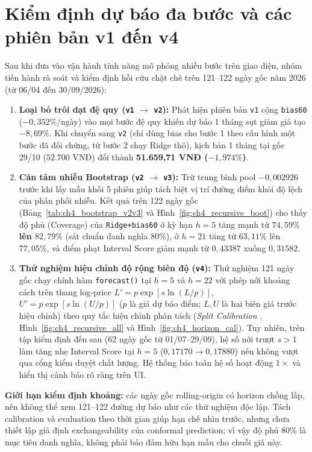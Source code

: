 \documentclass[12pt,a4paper]{report}
\begin{document}
\section{Kiểm định dự báo đa bước và các phiên bản v1 đến v4}
Sau khi đưa vào vận hành tính năng mô phỏng nhiều bước trên giao diện, nhóm tiến hành rà soát và kiểm định hồi cứu chặt chẽ trên 121--122 ngày gốc năm 2026 (từ 06/04 đến 30/09/2026):
\begin{enumerate}
    \item \textbf{Loại bỏ trôi dạt đệ quy (\texttt{v1} $\to$ \texttt{v2}):} Phát hiện phiên bản \texttt{v1} cộng \texttt{bias60} ($-0,352\%$/ngày) vào mọi bước đệ quy khiến dự báo 1 tháng sụt giảm giả tạo $-8,69\%$. Khi chuyển sang \texttt{v2} (chỉ dùng bias cho bước 1 theo cấu hình một bước đã đối chứng, từ bước 2 chạy Ridge thô), kịch bản 1 tháng tại gốc 29/10 ($52.700$ VNĐ) đổi thành \textbf{51.659,71 VNĐ ($-1,974\%$)}.
    \item \textbf{Căn tâm nhiễu Bootstrap (\texttt{v2} $\to$ \texttt{v3}):} Trừ trung bình pool $-0,002926$ trước khi lấy mẫu khối 5 phiên giúp tách biệt vị trí đường điểm khỏi độ lệch của phân phối nhiễu. Kết quả trên 122 ngày gốc (Bảng~\ref{tab:ch4_bootstrap_v2v3} và Hình~\ref{fig:ch4_recursive_boot}) cho thấy độ phủ (Coverage) của \texttt{Ridge+bias60} ở kỳ hạn $h=5$ tăng mạnh từ \textbf{$74,59\%$ lên $82,79\%$} (sát chuẩn danh nghĩa $80\%$), ở $h=21$ tăng từ $63,11\%$ lên $77,05\%$, và điểm phạt Interval Score giảm mạnh từ $0,43387$ xuống $0,31582$.
    \item \textbf{Thử nghiệm hiệu chỉnh độ rộng biên độ (\texttt{v4}):} Thử nghiệm 121 ngày gốc chạy chính hàm \texttt{forecast()} tại $h=5$ và $h=22$ với phép nới khoảng cách trên thang log-price $L' = p\exp\!\left[s\ln(L/p)\right]$, $U' = p\exp\!\left[s\ln(U/p)\right]$ ($p$ là giá dự báo điểm; $L,U$ là hai biên giá trước hiệu chỉnh) theo quy tắc hiệu chỉnh phân tách (\textit{Split Calibration} \cite{lei2018conformal}, Hình~\ref{fig:ch4_recursive_all} và Hình~\ref{fig:ch4_horizon_cal}). Tuy nhiên, trên tập kiểm định đến sau (62 ngày gốc từ 01/07--29/09), hệ số nới trượt $s > 1$ làm tăng nhẹ Interval Score tại $h=5$ ($0,17170 \to 0,17880$) nên không vượt qua cổng kiểm duyệt chất lượng. Hệ thống bảo toàn hệ số hoạt động \textbf{$1\times$} và hiển thị cảnh báo rõ ràng trên UI.
\end{enumerate}

\noindent\textbf{Giới hạn kiểm định khoảng:} các ngày gốc rolling-origin có horizon chồng lấp, nên không thể xem 121--122 đường dự báo như các thử nghiệm độc lập. Tách calibration và evaluation theo thời gian giúp hạn chế nhìn trước, nhưng chưa thiết lập giả định exchangeability của conformal prediction; vì vậy độ phủ $80\%$ là mục tiêu danh nghĩa, không phải bảo đảm hữu hạn mẫu cho chuỗi giá này.
\end{document}
